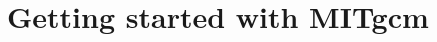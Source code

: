 
\chapter[Getting Started with MITgcm]{Getting started with MITgcm}



\newpage


\newpage


\newpage


